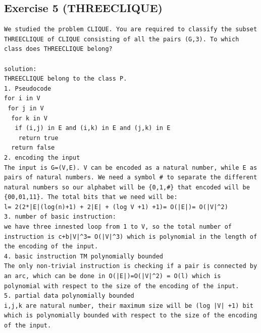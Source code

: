 \subsection{Exercise 5 (THREECLIQUE)}
\begin{lstlisting}[breaklines]
We studied the problem CLIQUE. You are required to classify the subset THREECLIQUE of CLIQUE consisting of all the pairs (G,3). To which class does THREECLIQUE belong?

solution:
THREECLIQUE belong to the class P.
1. Pseudocode
for i in V
 for j in V
  for k in V
   if (i,j) in E and (i,k) in E and (j,k) in E
    return true
  return false
2. encoding the input
The input is G=(V,E). V can be encoded as a natural number, while E as pairs of natural numbers. We need a symbol # to separate the different natural numbers so our alphabet will be {0,1,#} that encoded will be {00,01,11}. The total bits that we need will be:
l= 2(2*|E|(log(n)+1) + 2|E| + (log V +1) +1)= O(|E|)= O(|V|^2)
3. number of basic instruction:
we have three innested loop from 1 to V, so the total number of instruction is c+b|V|^3= O(|V|^3) which is polynomial in the length of the encoding of the input.
4. basic instruction TM polynomially bounded
The only non-trivial instruction is checking if a pair is connected by an arc, which can be done in O(|E|)=O(|V|^2) = O(l) which is polynomial with respect to the size of the encoding of the input.
5. partial data polynomially bounded 
i,j,k are natural number, their maximum size will be (log |V| +1) bit which is polynomially bounded with respect to the size of the encoding of the input.
\end{lstlisting}
